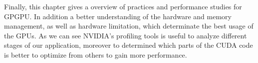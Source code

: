 \vspace{3.2em}

Finally, this chapter gives a overview of practices and performance studies for GPGPU. In addition a better understanding of the hardware and memory management, as well as hardware limitation, which determinate the best usage of the GPUs. As we can see NVIDIA's profiling tools is useful to analyze different stages of our application, moreover to determined which parts of the CUDA code is better to optimize from others to gain more performance.


